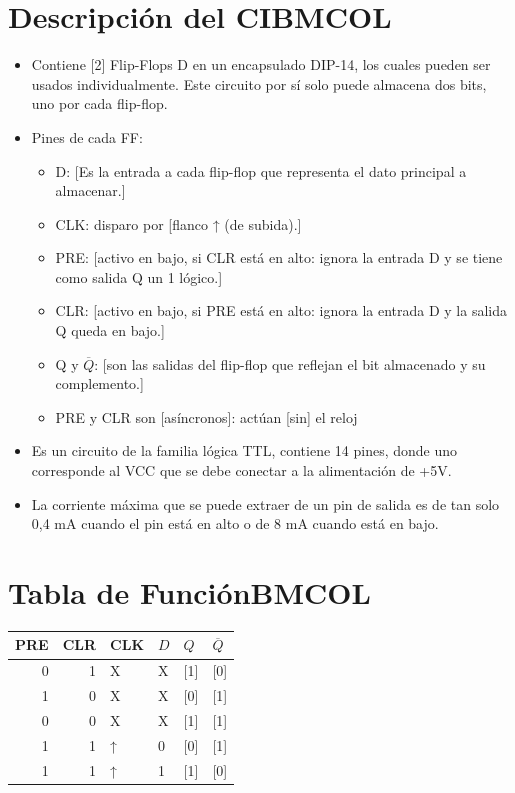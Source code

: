 \documentclass[presentation]{beamer}
\begin{document}
\section{Descripción del CI\hfill{}\textsc{BMCOL}}
\label{sec:org1ef7131}
\begin{itemize}
\item Contiene [2] Flip-Flops D en un encapsulado DIP-14, los cuales
pueden ser usados individualmente. Este circuito por sí solo puede
almacena dos bits, uno por cada flip-flop.
\item Pines de cada FF:
\begin{itemize}
\item D:   [Es la entrada a cada flip-flop que representa el dato principal a almacenar.]
\item CLK: disparo por [flanco ↑ (de subida).]
\item PRE: [activo en bajo, si CLR está en alto: ignora la entrada D y se tiene como salida
Q un 1 lógico.]
\item CLR: [activo en bajo, si PRE está en alto: ignora la entrada D y
la salida Q queda en bajo.]
\item Q y \(\overline{Q}\): [son las salidas del flip-flop que reflejan
el bit almacenado y su complemento.]
\item PRE y CLR son [asíncronos]: actúan [sin] el reloj
\end{itemize}
\item Es un circuito de la familia lógica TTL, contiene 14 pines, donde
uno corresponde al VCC que se debe conectar a la alimentación de
+5V.
\item La corriente máxima que se puede extraer de un pin de salida es de
tan solo 0,4 mA cuando el pin está en alto o de 8 mA cuando está en bajo.
\end{itemize}

\section{Tabla de Función\hfill{}\textsc{BMCOL}}
\label{sec:org374ffb8}
\begin{center}
\begin{tabular}{rrllll}
PRE & CLR & CLK & \(D\) & \(Q\) & \(\overline{Q}\)\\[0pt]
\hline
0 & 1 & X & X & [1] & [0]\\[0pt]
1 & 0 & X & X & [0] & [1]\\[0pt]
0 & 0 & X & X & [1] & [1]\\[0pt]
1 & 1 & ↑ & 0 & [0] & [1]\\[0pt]
1 & 1 & ↑ & 1 & [1] & [0]\\[0pt]
\end{tabular}
\end{center}
\end{document}
